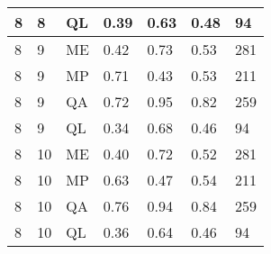 \begin{table}[!ht]
\begin{tabularx}{300pt}{|X|X|X|X|X|X|X|}
\hline
8&8&QL&0.39&0.63&0.48&94\\
\hline
8&9&ME&0.42&0.73&0.53&281\\
\hline
8&9&MP&0.71&0.43&0.53&211\\
\hline
8&9&QA&0.72&0.95&0.82&259\\
\hline
8&9&QL&0.34&0.68&0.46&94\\
\hline
8&10&ME&0.40&0.72&0.52&281\\
\hline
8&10&MP&0.63&0.47&0.54&211\\
\hline
8&10&QA&0.76&0.94&0.84&259\\
\hline
8&10&QL&0.36&0.64&0.46&94\\
\hline
\end{tabularx}
\end{table}